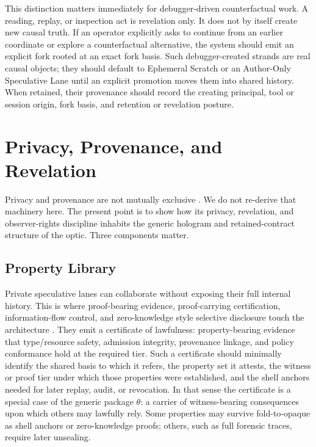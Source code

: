 \documentclass{aion}
\begin{document}
This distinction matters immediately for debugger-driven counterfactual work. A
reading, replay, or inspection act is revelation only. It does not by itself
create new causal truth. If an operator explicitly asks to continue from an
earlier coordinate or explore a counterfactual alternative, the system should
emit an explicit fork rooted at an exact fork basis. Such debugger-created
strands are real causal objects; they should default to Ephemeral Scratch or an
Author-Only Speculative Lane until an explicit promotion moves them into shared
history. When retained, their provenance should record the creating principal,
tool or session origin, fork basis, and retention or revelation posture.

\clearpage
\section{Privacy, Provenance, and Revelation}
\label{sec:privacy}

Privacy and provenance are not mutually exclusive \cite{Ross2026VI}. We do not
re-derive that machinery here. The present point
is to show how its privacy, revelation, and observer-rights discipline inhabits
the generic hologram and retained-contract structure of the \WARP{} optic.
Three components matter.

\subsection{Property Library}

Private speculative lanes can collaborate without exposing their full internal
history. This is where proof-bearing evidence, proof-carrying certification,
information-flow control, and zero-knowledge style selective disclosure touch
the architecture \cite{MartinLof1984,Necula1997,Denning1976,Goldwasser1989}.
They emit a certificate of lawfulness: property-bearing evidence that
type/resource safety, admission integrity, provenance linkage, and policy
conformance hold at the required tier. Such a certificate should minimally
identify the shared basis to which it refers, the property set it attests, the
witness or proof tier under which those properties were established, and the
shell anchors needed for later replay, audit, or revocation. In that sense the
certificate is a special case of the generic package \(\theta\): a carrier of
witness-bearing consequences upon which others may lawfully rely. Some
properties may survive fold-to-opaque as shell anchors or zero-knowledge proofs;
others, such as full forensic traces, require later unsealing.
\end{document}
